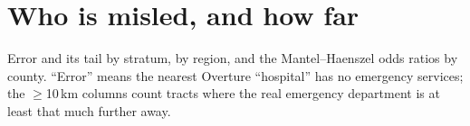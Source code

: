 \documentclass[a4paper]{article}
\begin{document}
\section{Who is misled, and how far}

\begin{table}[htbp]
\centering
\caption{Error and its tail by stratum, by region, and the Mantel--Haenszel odds ratios by
county. ``Error'' means the nearest Overture ``hospital'' has no emergency services; the
$\ge$10\,km columns count tracts where the real emergency department is at least that much
further away.}
\label{tab:severity}
\begin{adjustbox}{max width=\textwidth}

\end{adjustbox}
\end{table}
\end{document}
